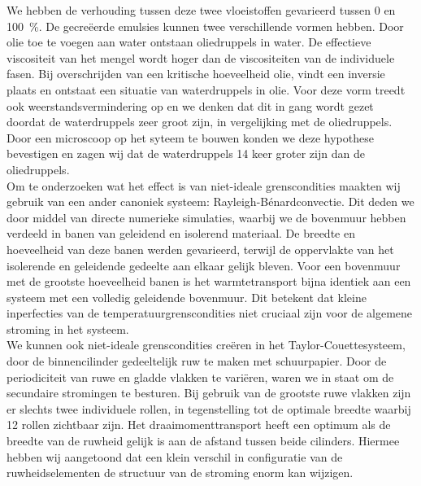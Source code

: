 We hebben de verhouding tussen deze twee vloeistoffen gevarieerd
tussen 0 en \SI{100}{\percent}.
De gecre\"eerde emulsies kunnen twee verschillende vormen hebben.
Door olie toe te voegen aan water ontstaan oliedruppels in water.
De  effectieve viscositeit van het mengel wordt hoger dan de viscositeiten van
de individuele fasen.
Bij overschrijden van een kritische hoeveelheid olie, vindt een inversie plaats
en ontstaat een situatie van waterdruppels in olie.
Voor deze vorm treedt ook weerstandsvermindering op en we denken dat dit in gang
wordt gezet doordat de waterdruppels zeer groot zijn, in vergelijking met de
oliedruppels.
Door een microscoop op het syteem te bouwen konden we deze hypothese
bevestigen en zagen wij dat de waterdruppels 14 keer groter zijn dan de
oliedruppels.\\
\indent Om te onderzoeken wat het effect is van niet-ideale grenscondities
maakten wij gebruik van een ander canoniek systeem: Rayleigh-B\'enardconvectie.
Dit deden we door middel van directe numerieke simulaties, waarbij we de
bovenmuur hebben verdeeld in banen van geleidend en isolerend materiaal. 
De breedte en hoeveelheid van deze banen werden gevarieerd, terwijl de
oppervlakte van het isolerende en geleidende gedeelte aan elkaar gelijk
bleven.
Voor een bovenmuur met de grootste hoeveelheid banen is het warmtetransport
bijna identiek aan een systeem met een volledig geleidende bovenmuur.
Dit betekent dat kleine inperfecties van de temperatuurgrenscondities niet
cruciaal zijn voor de algemene stroming in het systeem.\\
\indent We kunnen ook niet-ideale grenscondities cre\"eren in het
Taylor-Couettesysteem, door de binnencilinder gedeeltelijk ruw te maken met
schuurpapier.  Door de periodiciteit van ruwe en gladde vlakken te variëren,
waren we in staat om de secundaire stromingen te besturen.  Bij gebruik van de
grootste ruwe vlakken zijn er slechts twee individuele rollen, in
tegenstelling tot de optimale breedte waarbij 12 rollen zichtbaar zijn.  Het
draaimomenttransport heeft een optimum als de breedte van de ruwheid gelijk is
aan de afstand tussen beide cilinders.  Hiermee hebben wij aangetoond dat een
klein verschil in configuratie van de ruwheidselementen de structuur van de
stroming enorm kan wijzigen.
